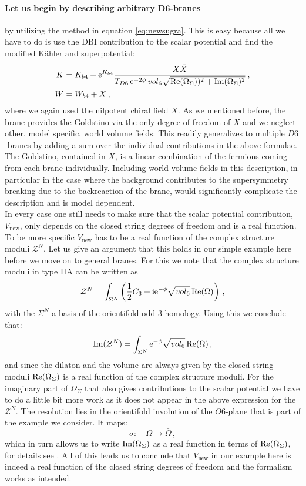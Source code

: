 \documentclass[a4paper,12pt,twoside,openright]{report}
\newcommand{\be}{\begin{equation}}
\newcommand{\ee}{\end{equation}}
\newcommand{\bea}{\begin{equation}\begin{aligned}}
\newcommand{\eea}{\end{aligned}\end{equation}}
\def\rmi{{\rm i}}
\def\rme{{\rm e}}
\def\rmre{{\rm Re}}
\def\rmim{{\rm Im}}
\begin{document}
\paragraph{Let us begin by describing arbitrary $\mathbf{D6}$-branes} by utilizing the method in equation \eqref{eq:newsugra}. This is easy because all we have to do is use the DBI contribution to the scalar potential and find the modified Kähler and superpotential:
\bea 
K &= K_{b4} + \rme^{K_{b4}} \frac{X\bar{X}}{T_{D6} \, \rme^{-2\phi} \, vol_6 \sqrt{\rmre (\Omega_\Sigma))^2 + \rmim (\Omega_\Sigma)^2}}\,,\\
W &= W_{b4} + X\,,
\eea
where we again used the nilpotent chiral field $X$. As we mentioned before, the brane provides the Goldstino via the only degree of freedom of $X$ and we neglect other, model specific, world volume fields. This readily generalizes to multiple $D6$-branes by adding a sum over the individual contributions in the above formulae. The Goldstino, contained in $X$, is a linear combination of the fermions coming from each brane individually. Including world volume fields in this description, in particular in the case where the background contributes to the supersymmetry breaking due to the backreaction of the brane, would significantly complicate the description and is model dependent.\\
In every case one still needs to make sure that the scalar potential contribution, $V_{\text{new}}$, only depends on the closed string degrees of freedom and is a real function. To be more specific $V_{\text{new}}$ has to be a real function of the complex structure moduli $\mathcal{Z}^N$. Let us give an argument that this holds in our simple example here before we move on to general branes. For this we note that the complex structure moduli in type IIA can be written as
\be 
\mathcal{Z}^N = \int_{\Sigma^N} \left(\frac{1}{2} C_3 + \rmi \rme^{-\phi} \sqrt{vol_6}\,\rmre(\Omega)\right)\,,
\ee
with the $\Sigma^N$ a basis of the orientifold odd 3-homology. Using this we conclude that:
\be 
\rmim(\mathcal{Z}^N) = \int_{\Sigma^N} \rme^{-\phi} \sqrt{vol_6} \, \rmre(\Omega)\,,
\ee
and since the dilaton and the volume are always given by the closed string moduli $\rmre(\Omega_\Sigma)$ is a real function of the complex structure moduli. For the imaginary part of $\Omega_\Sigma$ that also gives contributions to the scalar potential we have to do a little bit more work as it does not appear in the above expression for the $\mathcal{Z}^N$. The resolution lies in the orientifold involution of the $O6$-plane that is part of the example we consider. It maps:
\be 
\sigma:\quad \Omega \to \bar{\Omega}\,,
\ee
which in turn allows us to write $\rmim(\Omega_\Sigma)$ as a real function in terms of $\rmre(\Omega_\Sigma)$, for details see \cite{Grimm:2004ua}. All of this leads us to conclude that $V_{\text{new}}$ in our example here is indeed a real function of the closed string degrees of freedom and the formalism works as intended.
\end{document}
